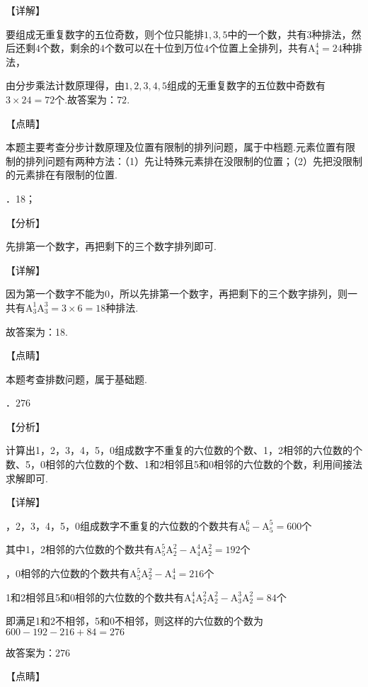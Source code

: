 \noindent 【详解】

\noindent 要组成无重复数字的五位奇数，则个位只能排$1,3,5$中的一个数，共有3种排法，然后还剩$4$个数，剩余的$4$个数可以在十位到万位$4$个位置上全排列，共有$\mathrm A_{4}^{4} =24$种排法，

\noindent 由分步乘法计数原理得，由$1,2,3,4,5$组成的无重复数字的五位数中奇数有$3\times 24=72$个.故答案为：$72$.

\noindent 【点睛】

\noindent 本题主要考查分步计数原理及位置有限制的排列问题，属于中档题.元素位置有限制的排列问题有两种方法：（1）先让特殊元素排在没限制的位置；（2）先把没限制的元素排在有限制的位置.

．18；

\noindent 【分析】

\noindent 先排第一个数字，再把剩下的三个数字排列即可.

\noindent 【详解】

\noindent 因为第一个数字不能为0，所以先排第一个数字，再把剩下的三个数字排列，则一共有$\mathrm A_{3}^{1} \mathrm A_{3}^{3} =3\times 6=18$种排法.

\noindent 故答案为：18.

\noindent 【点睛】

\noindent 本题考查排数问题，属于基础题.

．$276$

\noindent 【分析】

\noindent 计算出1，2，3，4，5，0组成数字不重复的六位数的个数、1，2相邻的六位数的个数、5，0相邻的六位数的个数、1和2相邻且5和0相邻的六位数的个数，利用间接法求解即可.

\noindent 【详解】

，2，3，4，5，0组成数字不重复的六位数的个数共有$\mathrm A_{6}^{6} -\mathrm A_{5}^{5} =600$个

\noindent 其中1，2相邻的六位数的个数共有$\mathrm A_{5}^{5} \mathrm A_{2}^{2} -\mathrm A_{4}^{4} \mathrm A_{2}^{2} =192$个

，0相邻的六位数的个数共有$\mathrm A_{5}^{5} \mathrm A_{2}^{2} -\mathrm A_{4}^{4} =216$个

\noindent 1和2相邻且5和0相邻的六位数的个数共有$\mathrm A_{4}^{4} \mathrm A_{2}^{2} \mathrm A_{2}^{2} -\mathrm A_{3}^{3} \mathrm A_{2}^{2} =84$个

\noindent 即满足1和2不相邻，5和0不相邻，则这样的六位数的个数为$600-192-216+84=276$

\noindent 故答案为：$276$

\noindent 【点睛】

